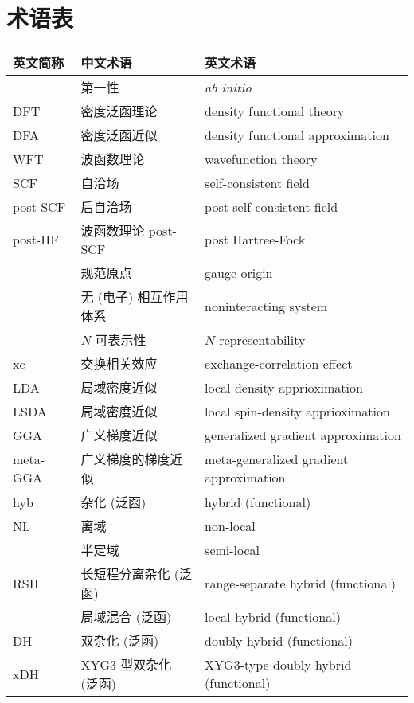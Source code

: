 
\chapter{术语表}

\begingroup
\setlength{\LTleft}{-20cm plus -1fill}
\setlength{\LTright}{\LTleft}

\begin{longtable}{lll}
    \hline
    英文简称 & 中文术语 & 英文术语 \\ \hline
    \endhead
    \hline
    \endfoot
    & 第一性 & \emph{ab initio} \\
    DFT & 密度泛函理论 & density functional theory \\
    DFA & 密度泛函近似 & density functional approximation \\
    WFT & 波函数理论 & wavefunction theory \\
    SCF & 自洽场 & self-consistent field \\
    post-SCF & 后自洽场 & post self-consistent field \\
    post-HF & 波函数理论 post-SCF & post Hartree-Fock \\
    & 规范原点 & gauge origin \\
    & 无 (电子) 相互作用体系 & noninteracting system \\
    & $N$ 可表示性 & $N$-representability \\
    xc & 交换相关效应 & exchange-correlation effect \\
    LDA & 局域密度近似 & local density apprioximation \\
    LSDA & 局域密度近似 & local spin-density apprioximation \\
    GGA & 广义梯度近似 & generalized gradient approximation \\
    meta-GGA & 广义梯度的梯度近似 & meta-generalized gradient approximation \\
    hyb & 杂化 (泛函) & hybrid (functional) \\
    NL & 离域 & non-local \\
    & 半定域 & semi-local \\
    RSH & 长短程分离杂化 (泛函) & range-separate hybrid (functional) \\
    & 局域混合 (泛函) & local hybrid (functional) \\
    DH & 双杂化 (泛函) & doubly hybrid (functional) \\
    xDH & XYG3 型双杂化 (泛函) & XYG3-type doubly hybrid (functional) \\

\end{longtable}

